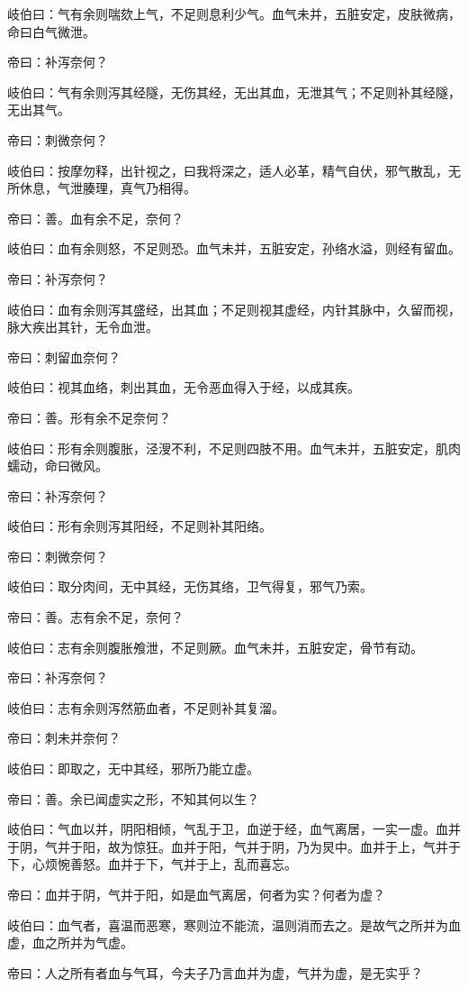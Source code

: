\documentclass{article}%
\begin{document}
岐伯曰：气有余则喘欬上气，不足则息利少气。血气未并，五脏安定，皮肤微病，命曰白气微泄。

帝曰：补泻奈何？

岐伯曰：气有余则泻其经隧，无伤其经，无出其血，无泄其气；不足则补其经隧，无出其气。

帝曰：刺微奈何？

岐伯曰：按摩勿释，出针视之，曰我将深之，适人必革，精气自伏，邪气散乱，无所休息，气泄腠理，真气乃相得。

帝曰：善。血有余不足，奈何？

岐伯曰：血有余则怒，不足则恐。血气未并，五脏安定，孙络水溢，则经有留血。

帝曰：补泻奈何？

岐伯曰：血有余则泻其盛经，出其血；不足则视其虚经，内针其脉中，久留而视，脉大疾出其针，无令血泄。

帝曰：刺留血奈何？

岐伯曰：视其血络，刺出其血，无令恶血得入于经，以成其疾。

帝曰：善。形有余不足奈何？

岐伯曰：形有余则腹胀，泾溲不利，不足则四肢不用。血气未并，五脏安定，肌肉蠕动，命曰微风。

帝曰：补泻奈何？

岐伯曰：形有余则泻其阳经，不足则补其阳络。

帝曰：刺微奈何？

岐伯曰：取分肉间，无中其经，无伤其络，卫气得复，邪气乃索。

帝曰：善。志有余不足，奈何？

岐伯曰：志有余则腹胀飧泄，不足则厥。血气未并，五脏安定，骨节有动。

帝曰：补泻奈何？

岐伯曰：志有余则泻然筋血者，不足则补其复溜。

帝曰：刺未并奈何？

岐伯曰：即取之，无中其经，邪所乃能立虚。

帝曰：善。余已闻虚实之形，不知其何以生？

岐伯曰：气血以并，阴阳相倾，气乱于卫，血逆于经，血气离居，一实一虚。血并于阴，气并于阳，故为惊狂。血并于阳，气并于阴，乃为炅中。血并于上，气并于下，心烦惋善怒。血并于下，气并于上，乱而喜忘。

帝曰：血并于阴，气并于阳，如是血气离居，何者为实？何者为虚？

岐伯曰：血气者，喜温而恶寒，寒则泣不能流，温则消而去之。是故气之所并为血虚，血之所并为气虚。

帝曰：人之所有者血与气耳，今夫子乃言血并为虚，气并为虚，是无实乎？
\end{document}
